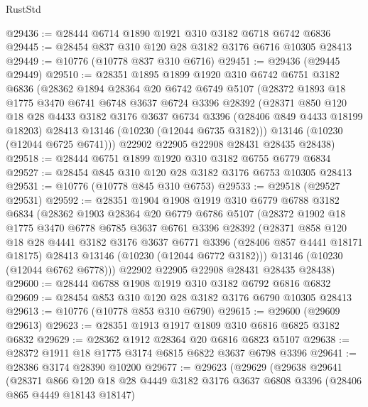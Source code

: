 \begin{lexlean}{RustStd}
\begin{coremodule}
@29436 := @28444 @6714 @1890 @1921 @310 @3182 @6718 @6742 @6836
@29445 := @28454 @837 @310 @120 @28 @3182 @3176 @6716 @10305 @28413
@29449 := @10776 (@10778 @837 @310 @6716)
@29451 := @29436 (@29445 @29449)
@29510 := @28351
    @1895
    @1899
    @1920
    @310
    @6742
    @6751
    @3182
    @6836
    (@28362
      @1894
      @28364
      @20
      @6742
      @6749
      @5107
      (@28372
        @1893
        @18
        @1775
        @3470
        @6741
        @6748
        @3637
        @6724
        @3396
        @28392
        (@28371
          @850
          @120
          @18
          @28
          @4433
          @3182
          @3176
          @3637
          @6734
          @3396
          (@28406 @849 @4433 @18199 @18203)
          @28413
          @13146
          (@10230 (@12044 @6735 @3182)))
        @13146
        (@10230 (@12044 @6725 @6741)))
      @22902
      @22905
      @22908
      @28431
      @28435
      @28438)
@29518 := @28444 @6751 @1899 @1920 @310 @3182 @6755 @6779 @6834
@29527 := @28454 @845 @310 @120 @28 @3182 @3176 @6753 @10305 @28413
@29531 := @10776 (@10778 @845 @310 @6753)
@29533 := @29518 (@29527 @29531)
@29592 := @28351
    @1904
    @1908
    @1919
    @310
    @6779
    @6788
    @3182
    @6834
    (@28362
      @1903
      @28364
      @20
      @6779
      @6786
      @5107
      (@28372
        @1902
        @18
        @1775
        @3470
        @6778
        @6785
        @3637
        @6761
        @3396
        @28392
        (@28371
          @858
          @120
          @18
          @28
          @4441
          @3182
          @3176
          @3637
          @6771
          @3396
          (@28406 @857 @4441 @18171 @18175)
          @28413
          @13146
          (@10230 (@12044 @6772 @3182)))
        @13146
        (@10230 (@12044 @6762 @6778)))
      @22902
      @22905
      @22908
      @28431
      @28435
      @28438)
@29600 := @28444 @6788 @1908 @1919 @310 @3182 @6792 @6816 @6832
@29609 := @28454 @853 @310 @120 @28 @3182 @3176 @6790 @10305 @28413
@29613 := @10776 (@10778 @853 @310 @6790)
@29615 := @29600 (@29609 @29613)
@29623 := @28351 @1913 @1917 @1809 @310 @6816 @6825 @3182 @6832
@29629 := @28362 @1912 @28364 @20 @6816 @6823 @5107
@29638 := @28372 @1911 @18 @1775 @3174 @6815 @6822 @3637 @6798 @3396
@29641 := @28386 @3174 @28390 @10200
@29677 := @29623
    (@29629
      (@29638
        @29641
        (@28371
          @866
          @120
          @18
          @28
          @4449
          @3182
          @3176
          @3637
          @6808
          @3396
          (@28406 @865 @4449 @18143 @18147)

\end{coremodule}
\end{lexlean}
